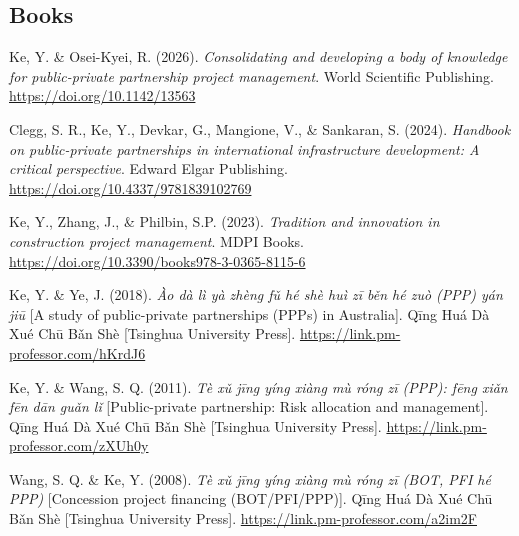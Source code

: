 \documentclass[11pt,a4paper]{report} %
\begin{document}
    \subsection*{Books}

    \begin{tablist}

        \item[2026] \tab{}Ke, Y. \& Osei-Kyei, R. (2026). \textit{Consolidating and developing a body of knowledge for public-private partnership project management}. World Scientific Publishing. \href{https://doi.org/10.1142/13563}{https://doi.org/10.1142/13563}

        \item[2024] \tab{}Clegg, S. R., Ke, Y., Devkar, G., Mangione, V., \& Sankaran, S. (2024). \textit{Handbook on public-private partnerships in international infrastructure development: A critical perspective}. Edward Elgar Publishing. \href{https://doi.org/10.4337/9781839102769}{https://doi.org/10.4337/9781839102769}

        \item[2023] \tab{}Ke, Y., Zhang, J., \& Philbin, S.P. (2023). \textit{Tradition and innovation in construction project management}. MDPI Books. \href{https://doi.org/10.3390/books978-3-0365-8115-6}{https://doi.org/10.3390/books978-3-0365-8115-6}

        \item[2018] \tab{}Ke, Y. \& Ye, J. (2018). \textit{Ào dà lì yà zhèng fǔ hé shè huì zī běn hé zuò (PPP) yán jiū} [A study of public-private partnerships (PPPs) in Australia]. Qīng Huá Dà Xué Chū Bǎn Shè [Tsinghua University Press]. \href{https://link.pm-professor.com/hKrdJ6}{https://link.pm-professor.com/hKrdJ6}        

        \item[2011] \tab{}Ke, Y. \& Wang, S. Q. (2011). \textit{Tè xǔ jīng yíng xiàng mù róng zī (PPP): fēng xiǎn fēn dān guǎn lǐ} [Public-private partnership: Risk allocation and management]. Qīng Huá Dà Xué Chū Bǎn Shè [Tsinghua University Press]. \href{https://link.pm-professor.com/zXUh0y}{https://link.pm-professor.com/zXUh0y}

        \item[2008] \tab{}Wang, S. Q. \& Ke, Y. (2008). \textit{Tè xǔ jīng yíng xiàng mù róng zī (BOT, PFI hé PPP)} [Concession project financing (BOT/PFI/PPP)]. Qīng Huá Dà Xué Chū Bǎn Shè [Tsinghua University Press]. \href{https://link.pm-professor.com/a2im2F}{https://link.pm-professor.com/a2im2F}

    \end{tablist}
\end{document}
